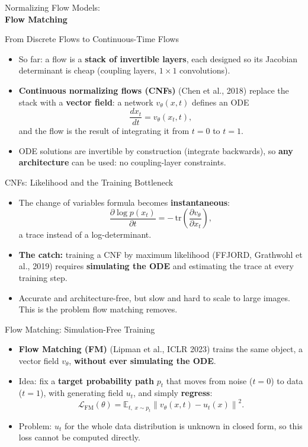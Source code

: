 \begin{frame}[allowframebreaks]{}
    \LARGE Normalizing Flow Models: \\[1.5ex] \textbf{Flow Matching}
\end{frame}

\begin{frame}{From Discrete Flows to Continuous-Time Flows}
\begin{itemize}
    \item So far: a flow is a \textbf{stack of invertible layers}, each designed so its Jacobian determinant is cheap (coupling layers, $1\times1$ convolutions).
    \item \textbf{Continuous normalizing flows (CNFs)} (Chen et al., 2018) replace the stack with a \textbf{vector field}: a network $v_\theta(x, t)$ defines an ODE
    $$
    \frac{dx_t}{dt} = v_\theta(x_t, t),
    $$
    and the flow is the result of integrating it from $t=0$ to $t=1$.
    \item ODE solutions are invertible by construction (integrate backwards), so \textbf{any architecture} can be used: no coupling-layer constraints.
\end{itemize}
\end{frame}

\begin{frame}{CNFs: Likelihood and the Training Bottleneck}
\begin{itemize}
    \item The change of variables formula becomes \textbf{instantaneous}:
    $$
    \frac{\partial \log p(x_t)}{\partial t} = -\,\mathrm{tr}\!\left( \frac{\partial v_\theta}{\partial x_t} \right),
    $$
    a trace instead of a log-determinant.
    \item \textbf{The catch:} training a CNF by maximum likelihood (FFJORD, Grathwohl et al., 2019) requires \textbf{simulating the ODE} and estimating the trace at every training step.
    \item Accurate and architecture-free, but slow and hard to scale to large images. This is the problem flow matching removes.
\end{itemize}
\end{frame}

\begin{frame}{Flow Matching: Simulation-Free Training}
\begin{itemize}
    \item \textbf{Flow Matching (FM)} (Lipman et al., ICLR 2023) trains the same object, a vector field $v_\theta$, \textbf{without ever simulating the ODE}.
    \item Idea: fix a \textbf{target probability path} $p_t$ that moves from noise ($t=0$) to data ($t=1$), with generating field $u_t$, and simply \textbf{regress}:
    $$
    \mathcal{L}_{\mathrm{FM}}(\theta) = \mathbb{E}_{t,\; x \sim p_t} \left\| v_\theta(x, t) - u_t(x) \right\|^2 .
    $$
    \item Problem: $u_t$ for the whole data distribution is unknown in closed form, so this loss cannot be computed directly.
\end{itemize}
\end{frame}

